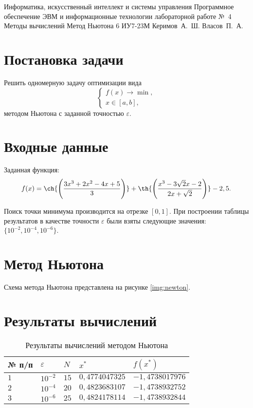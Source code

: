 \documentclass{bmstu-gost-7-32}
\begin{document}
\makereporttitle
	{Информатика, искусственный интеллект и системы управления} %
	{Программное обеспечение ЭВМ и информационные технологии} %
	{лабораторной работе №~4} %
	{Методы вычислений} %
	{Метод Ньютона} %
	{6} %
	{ИУ7-23М} %
	{Керимов~А.~Ш.} %
	{Власов~П.~А.} %

\section*{Постановка задачи}

Решить одномерную задачу оптимизации вида
\begin{equation}
	\begin{cases}
		f(x) \to \min, \\
		x \in [a, b],
	\end{cases}
\end{equation}
методом Ньютона с заданной точностью $\varepsilon$.

\section*{Входные данные}

Заданная функция:
\begin{equation}
	f(x) = \ch{\left(\frac{3x^3 + 2x^2 - 4x + 5}{3}\right)} + \th{\left(\frac{x^3 - 3\sqrt2x - 2}{2x + \sqrt2}\right)} - 2,5.
\end{equation}

Поиск точки минимума производится на отрезке $[0, 1]$.
При построении таблицы результатов в качестве точности $\varepsilon$ были взяты следующие значения: $\{10^{-2}, 10^{-4}, 10^{-6}\}$.

\section*{Метод Ньютона}

Схема метода Ньютона представлена на рисунке \ref{img:newton}.


\section*{Результаты вычислений}

\begin{table}[H]
	\caption{Результаты вычислений методом Ньютона}
	\begin{tabular}{|l|l|l|l|l|}
		\hline
		№ п/п & $\varepsilon$ & $N$  & $x^*$          & $f(x^*)$        \\ \hline
		$1$   & $10^{-2}$     & $15$ & $0,4774047325$ & $-1,4738017976$ \\ \hline
		$2$   & $10^{-4}$     & $20$ & $0,4823683107$ & $-1,4738932752$ \\ \hline
		$3$   & $10^{-6}$     & $25$ & $0,4824178114$ & $-1,4738932844$ \\ \hline
	\end{tabular}
\end{table}
\end{document}
